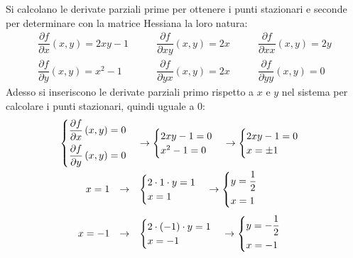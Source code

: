 \documentclass[a4paper]{article}
\begin{document}
	\noindent
	Si calcolano le derivate parziali prime per ottenere i punti stazionari e seconde per determinare con la matrice Hessiana la loro natura:
	\begin{equation*}
		\begin{array}{lll}
			\dfrac{\partial f}{\partial x}\left(x,y\right) = 2xy-1 \hspace{2em} & \dfrac{\partial f}{\partial xy}\left(x,y\right) = 2x \hspace{2em} & \dfrac{\partial f}{\partial xx}\left(x,y\right) = 2y \\ [1em]
			\dfrac{\partial f}{\partial y}\left(x,y\right) = x^{2}-1 \hspace{2em} & \dfrac{\partial f}{\partial yx}\left(x,y\right) = 2x \hspace{2em} & \dfrac{\partial f}{\partial yy}\left(x,y\right) = 0
		\end{array}
	\end{equation*}
	Adesso si inseriscono le derivate parziali primo rispetto a $x$ e $y$ nel sistema per calcolare i punti stazionari, quindi uguale a $0$:
	\begin{gather*}
		\begin{cases}
			\dfrac{\partial f}{\partial x}\left(x,y\right) = 0 \vspace{.5em} \\
			\dfrac{\partial f}{\partial y}\left(x,y\right) = 0 
		\end{cases}
		\rightarrow
		\begin{cases}
			2xy-1 = 0 \\
			x^{2}-1 = 0
		\end{cases}
		\rightarrow
		\begin{cases}
			2xy-1 = 0 \\
			x = \pm 1
		\end{cases}
		\\
		\begin{array}{rcl}
			x = 1 
			& \rightarrow & 
			\begin{cases}
				2 \cdot 1 \cdot y = 1 \\
				x = 1
			\end{cases}
			\rightarrow
			\begin{cases}
				y = \dfrac{1}{2} \vspace{.3em} \\
				x = 1
			\end{cases} \\ [2em]
			x = -1
			& \rightarrow & 
			\begin{cases}
				2 \cdot \left(-1\right) \cdot y = 1 \\
				x = -1
			\end{cases}
			\rightarrow
			\begin{cases}
				y = -\dfrac{1}{2} \vspace{.3em} \\
				x = -1
			\end{cases} \\ [1em]
		\end{array}
	\end{gather*}
\end{document}
